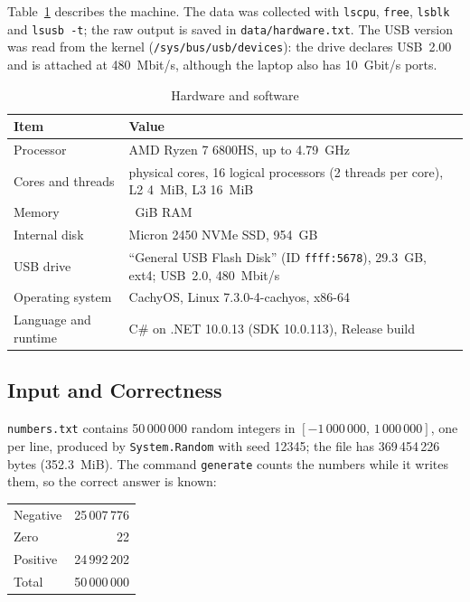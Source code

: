 \documentclass[12pt,a4paper]{article}
\begin{document}
Table~\ref{tab:hardware} describes the machine. The data was collected with \texttt{lscpu}, \texttt{free}, \texttt{lsblk} and \texttt{lsusb -t}; the raw output is saved in \texttt{data/hardware.txt}. The USB version was read from the kernel (\texttt{/sys/bus/usb/devices}): the drive declares USB~2.00 and is attached at 480~Mbit/s, although the laptop also has 10~Gbit/s ports.

\begin{table}[H]
  \centering
  \caption{Hardware and software}
  \renewcommand{\arraystretch}{1.25}
  \begin{tabular}{>{\raggedright\arraybackslash}p{}>{\raggedright\arraybackslash}p{}}
    \toprule
    \textbf{Item} & \textbf{Value} \\
    \midrule
    Processor & AMD Ryzen 7 6800HS, up to 4.79~GHz \\
    Cores and threads & 8 physical cores, 16 logical processors (2 threads per core), L2 4~MiB, L3 16~MiB \\
    Memory & 14~GiB RAM \\
    Internal disk & Micron 2450 NVMe SSD, 954~GB \\
    USB drive & ``General USB Flash Disk'' (ID \texttt{ffff:5678}), 29.3~GB, ext4; USB~2.0, 480~Mbit/s \\
    Operating system & CachyOS, Linux 7.3.0-4-cachyos, x86-64 \\
    Language and runtime & C\# on .NET 10.0.13 (SDK 10.0.113), Release build \\
    \bottomrule
  \end{tabular}
  \label{tab:hardware}
\end{table}

\subsection{Input and Correctness}

\texttt{numbers.txt} contains 50\,000\,000 random integers in $[-1\,000\,000,\,1\,000\,000]$, one per line, produced by \texttt{System.Random} with seed 12345; the file has 369\,454\,226 bytes (352.3~MiB). The command \texttt{generate} counts the numbers while it writes them, so the correct answer is known:

\begin{center}
  \renewcommand{\arraystretch}{1.15}
  \begin{tabular}{lr}
    \toprule
    Negative & 25\,007\,776 \\
    Zero & 22 \\
    Positive & 24\,992\,202 \\
    \midrule
    Total & 50\,000\,000 \\
    \bottomrule
  \end{tabular}
\end{center}
\end{document}
